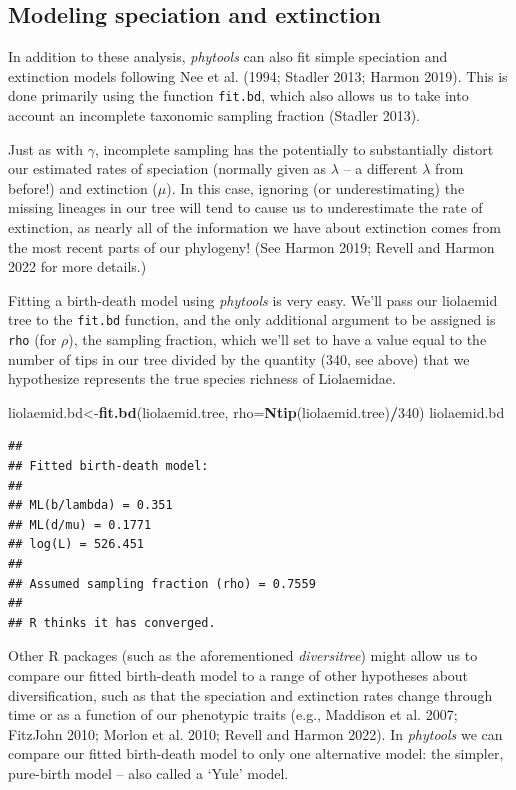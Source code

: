 \documentclass[fleqn,10pt,lineno]{wlpeerj} %
\newenvironment{Shaded}{\begin{snugshade}}{\end{snugshade}}
\newcommand{\AttributeTok}[1]{\textcolor[rgb]{0.13,0.29,0.53}{#1}}
\newcommand{\DecValTok}[1]{\textcolor[rgb]{0.00,0.00,0.81}{#1}}
\newcommand{\FunctionTok}[1]{\textcolor[rgb]{0.13,0.29,0.53}{\textbf{#1}}}
\newcommand{\NormalTok}[1]{#1}
\newcommand{\OtherTok}[1]{\textcolor[rgb]{0.56,0.35,0.01}{#1}}
\newcommand{\SpecialCharTok}[1]{\textcolor[rgb]{0.81,0.36,0.00}{\textbf{#1}}}
\begin{document}
\hypertarget{modeling-speciation-and-extinction}{%
\subsection{Modeling speciation and extinction}\label{modeling-speciation-and-extinction}}

In addition to these analysis, \emph{phytools} can also fit simple speciation and extinction models following Nee et al. (1994; Stadler 2013; Harmon 2019). This is done primarily using the function \texttt{fit.bd}, which also allows us to take into account an incomplete taxonomic sampling fraction (Stadler 2013).

Just as with \(\gamma\), incomplete sampling has the potentially to substantially distort our estimated rates of speciation (normally given as \(\lambda\) -- a different \(\lambda\) from before!) and extinction (\(\mu\)). In this case, ignoring (or underestimating) the missing lineages in our tree will tend to cause us to underestimate the rate of extinction, as nearly all of the information we have about extinction comes from the most recent parts of our phylogeny! (See Harmon 2019; Revell and Harmon 2022 for more details.)

Fitting a birth-death model using \emph{phytools} is very easy. We'll pass our liolaemid tree to the \texttt{fit.bd} function, and the only additional argument to be assigned is \texttt{rho} (for \(\rho\)), the sampling fraction, which we'll set to have a value equal to the number of tips in our tree divided by the quantity (340, see above) that we hypothesize represents the true species richness of Liolaemidae.

\begin{Shaded}
\begin{Highlighting}[]
\NormalTok{liolaemid.bd}\OtherTok{\textless{}{-}}\FunctionTok{fit.bd}\NormalTok{(liolaemid.tree,}
  \AttributeTok{rho=}\FunctionTok{Ntip}\NormalTok{(liolaemid.tree)}\SpecialCharTok{/}\DecValTok{340}\NormalTok{)}
\NormalTok{liolaemid.bd}
\end{Highlighting}
\end{Shaded}

\begin{verbatim}
## 
## Fitted birth-death model:
## 
## ML(b/lambda) = 0.351 
## ML(d/mu) = 0.1771 
## log(L) = 526.451 
## 
## Assumed sampling fraction (rho) = 0.7559 
## 
## R thinks it has converged.
\end{verbatim}

Other R packages (such as the aforementioned \emph{diversitree}) might allow us to compare our fitted birth-death model to a range of other hypotheses about diversification, such as that the speciation and extinction rates change through time or as a function of our phenotypic traits (e.g., Maddison et al. 2007; FitzJohn 2010; Morlon et al. 2010; Revell and Harmon 2022). In \emph{phytools} we can compare our fitted birth-death model to only one alternative model: the simpler, pure-birth model -- also called a `Yule' model.
\end{document}
